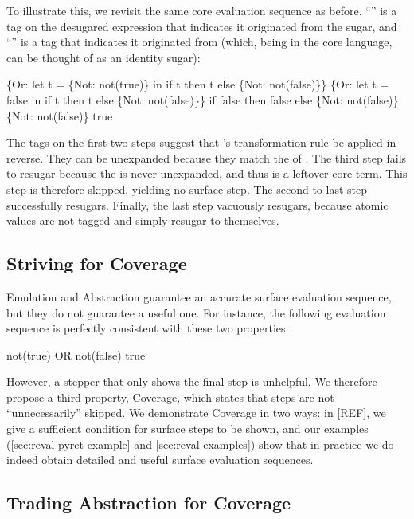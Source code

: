 To illustrate this, we revisit the same core evaluation sequence as
before. ``'' is a tag on the desugared expression that
indicates it originated from the  sugar, and ``''
is a tag that indicates it originated from  (which, being in
the core language, can be thought of as an identity sugar):
\begin{Codes}
    \{Or: let t = \{Not: not(true)\} in
      if t then t else \{Not: not(false)\}\}
\CoreStep \{Or: let t = false in
      if t then t else \{Not: not(false)\}\}
\CoreStep if false then false else \{Not: not(false)\}
\CoreStep \{Not: not(false)\}
\CoreStep true
\end{Codes}
The tags on the first two steps suggest that 's
transformation rule be applied in reverse. They can be unexpanded
because they match the  of . The third step fails to
resugar because the  is never unexpanded, and thus is a
leftover core term. This step is therefore skipped, yielding no
surface step. The second to last step successfully resugars. Finally,
the last step vacuously resugars, because atomic values are not tagged
and simply resugar to themselves.

\subsection{Striving for Coverage}

Emulation and Abstraction guarantee an accurate
surface evaluation sequence, but they do not guarantee a useful one. For
instance, the following evaluation sequence is perfectly consistent with
these two properties:
\begin{Codes}
    not(true) OR not(false)
\SurfStep true
\end{Codes}
However, a stepper that only shows the final step is unhelpful. We therefore
propose a third property, Coverage, which states that steps
are not ``unnecessarily'' skipped. We demonstrate Coverage in two
ways: in [REF], we give a sufficient condition for surface steps to be
shown, and our examples (\cref{sec:reval-pyret-example} and
\cref{sec:reval-examples}) show that in practice we do indeed obtain
detailed and useful surface evaluation sequences.

\subsection{Trading Abstraction for Coverage}
\label{sec:reval-trading}

